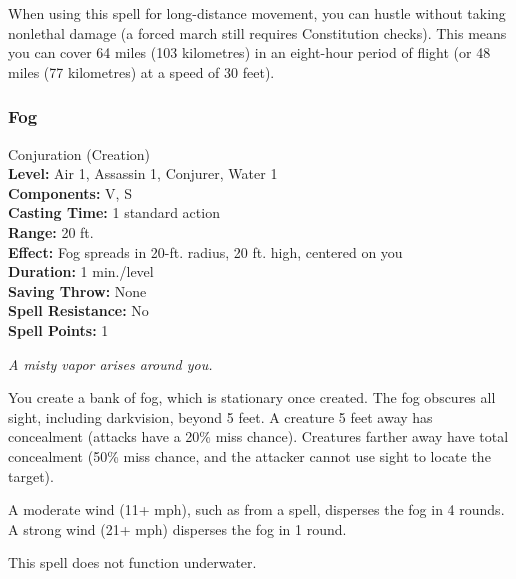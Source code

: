 When using this spell for long-distance movement, you can hustle without taking nonlethal damage 
(a forced march still requires Constitution checks). 
This means you can cover 64 miles (103 kilometres) in an eight-hour period of flight (or 48 miles (77 kilometres) at a speed of 30 feet).

\subsubsection{Fog}
\label{Spell:Fog}
Conjuration (Creation)
\\ \textbf{Level:} Air 1, Assassin 1, Conjurer, Water 1
\\ \textbf{Components:} V, S
\\ \textbf{Casting Time:} 1 standard action
\\ \textbf{Range:} 20 ft.
\\ \textbf{Effect:} Fog spreads in 20-ft. radius, 20 ft. high, centered on you
\\ \textbf{Duration:} 1 min./level
\\ \textbf{Saving Throw:} None
\\ \textbf{Spell Resistance:} No
\\ \textbf{Spell Points:} 1

\emph{A misty vapor arises around you. }

You create a bank of fog, which is stationary once created. 
The fog obscures all sight, including darkvision, beyond 5 feet. 
A creature 5 feet away has concealment (attacks have a 20\% miss chance). 
Creatures farther away have total concealment (50\% miss chance, and the attacker cannot use sight to locate the target).

A moderate wind (11+ mph), such as from a  spell, disperses the fog in 4 rounds. 
A strong wind (21+ mph) disperses the fog in 1 round. 

This spell does not function underwater.

